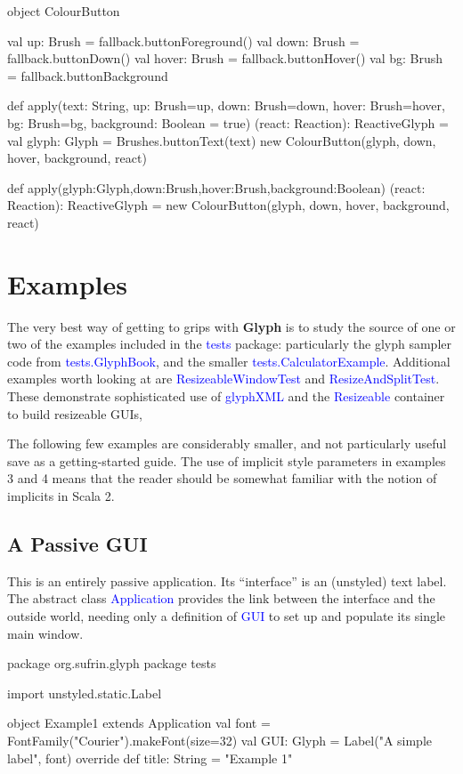 \documentclass[12pt,a4paper]{article}
\def\Scala#1{\textcolor{blue}{\textsf{#1}}}
\def\S#1{\section{#1}}
\def\SS#1{\subsection{#1}}
\begin{document}
\begin{scala}
object ColourButton {
    val up:    Brush = fallback.buttonForeground()
    val down:  Brush = fallback.buttonDown()
    val hover: Brush = fallback.buttonHover()
    val bg:    Brush = fallback.buttonBackground

    def apply(text:  String,
           up: Brush=up, down: Brush=down, hover: Brush=hover,
           bg: Brush=bg, background: Boolean = true)
          (react: Reaction): ReactiveGlyph =
 { val glyph: Glyph = Brushes.buttonText(text)
   new ColourButton(glyph, down, hover, background, react)
 }


 def apply(glyph:Glyph,down:Brush,hover:Brush,background:Boolean)
          (react: Reaction): ReactiveGlyph =
     new ColourButton(glyph, down, hover, background, react)
}
\end{scala}
\clearpage
\S{Examples}

The very best way of getting to grips with \textbf{Glyph} is to
study the source of one or two of the examples included in the
\Scala{tests} package: particularly the glyph sampler code from
\Scala{tests.GlyphBook}, and the smaller
\Scala{tests.CalculatorExample}.  Additional examples worth looking
at are \Scala{ResizeableWindowTest} and \Scala{ResizeAndSplitTest}.
These demonstrate sophisticated use of \Scala{glyphXML} 
and the \Scala{Resizeable} container to build resizeable GUIs,

The following few examples are considerably smaller, and not
particularly useful save as a getting-started guide.  The use of
implicit style parameters in examples 3 and 4 means that the reader
should be somewhat familiar with the notion of implicits in Scala
2.


\SS{A Passive GUI}

This is an entirely passive application.
Its ``interface'' is an (unstyled) text label.
The abstract class \Scala{Application} provides the link between
the interface and the outside world, needing only a definition of
\Scala{GUI} to set up and populate its single main window.

\begin{scala}
package org.sufrin.glyph
package tests

import unstyled.static.Label

object Example1 extends Application  {
  val font = FontFamily("Courier").makeFont(size=32)
  val GUI: Glyph = Label("A simple label", font)
  override def title: String = "Example 1"
}
\end{scala}
\end{document}
